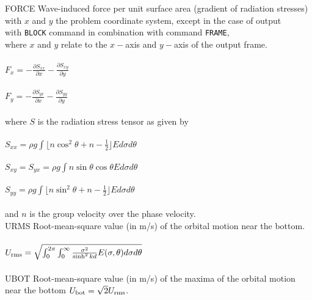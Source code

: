 \documentclass[12pt]{book}
\begin{document}
\begin{tabbing}
FORCE                \> Wave-induced force per unit surface area (gradient of radiation stresses)\+\\
                        with $x$ and $y$ the problem coordinate system, except in the case of output\\
                        with {\tt BLOCK} command in
                        combination with command {\tt FRAME},\\
                        where $x$ and $y$ relate to the $x-$axis and $y-$axis of the output frame.\\
                        \\
$F_x = -\frac{\partial S_{xx}}{\partial x} - \frac{\partial S_{xy}}{\partial y}$ \\
                        \\
$F_y = -\frac{\partial S_{yx}}{\partial x} - \frac{\partial S_{yy}}{\partial y}$ \\
                        \\
                        where $S$ is the radiation stress tensor as given by\\
                        \\
$S_{xx} = \rho g \int \lfloor n \cos^2\theta + n - \frac{1}{2} \rfloor E d\sigma d\theta$ \\
                        \\
$S_{xy} = S_{yx} = \rho g \int n \sin\theta \cos\theta E d\sigma d\theta$ \\
                        \\
$S_{yy} = \rho g \int \lfloor n \sin^2\theta + n - \frac{1}{2} \rfloor E d\sigma d\theta$ \\
                        \\
                        and $n$ is the group velocity over the phase velocity.\-\\
URMS                 \> Root-mean-square value (in m/s) of the orbital motion near the bottom.\+\\
                        \\
$U_{\rm rms} = \sqrt{\int_{0}^{2\pi} \int_{0}^{\infty} \frac{\sigma^2}{\sinh^2 kd} E(\sigma,\theta) d\sigma d\theta}$
                        \\
                        \-\\
UBOT                 \> Root-mean-square value (in m/s) of the maxima of the orbital motion\+\\
                        near the bottom $U_{\rm bot} = \sqrt{2} U_{\rm rms}$.\-\\

\end{tabbing}
\end{document}
